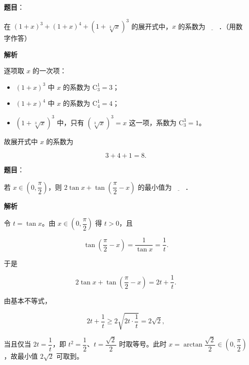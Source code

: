 \begin{answer}

\textbf{题目}：

在 $(1+x)^3+(1+x)^4+(1+\sqrt[3]{x})^3$ 的展开式中，$x$ 的系数为$\underline{\qquad}$．（用数字作答）

\textbf{解析}

逐项取 $x$ 的一次项：

\begin{itemize}
\item $(1+x)^3$ 中 $x$ 的系数为 $\mathrm C_3^1=3$；
\item $(1+x)^4$ 中 $x$ 的系数为 $\mathrm C_4^1=4$；
\item $(1+\sqrt[3]x)^3$ 中，只有 $(\sqrt[3]x)^3=x$ 这一项，系数为 $\mathrm C_3^3=1$。
\end{itemize}

故展开式中 $x$ 的系数为

\nopagebreak[4]
\[3+4+1=8.\]


\end{answer}
\begin{answer}

\textbf{题目}：

若 $x\in\left(0,\dfrac\pi2\right)$，则 $2\tan x+\tan\left(\dfrac\pi2-x\right)$ 的最小值为$\underline{\qquad}$．

\textbf{解析}

令 $t=\tan x$。由 $x\in\left(0,\dfrac\pi2\right)$ 得 $t>0$，且

\nopagebreak[4]
\[\tan\left(\frac\pi2-x\right)=\frac1{\tan x}=\frac1t.\]

于是

\nopagebreak[4]
\[2\tan x+\tan\left(\frac\pi2-x\right)=2t+\frac1t.\]

由基本不等式，

\nopagebreak[4]
\[2t+\frac1t\geqslant2\sqrt{2t\cdot\frac1t}=2\sqrt2,\]

当且仅当 $2t=\dfrac1t$，即 $t^2=\dfrac12$、$t=\dfrac{\sqrt2}2$ 时取等号。此时 $x=\arctan\dfrac{\sqrt2}2\in\left(0,\dfrac\pi2\right)$，故最小值 $2\sqrt2$ 可取到。


\end{answer}
